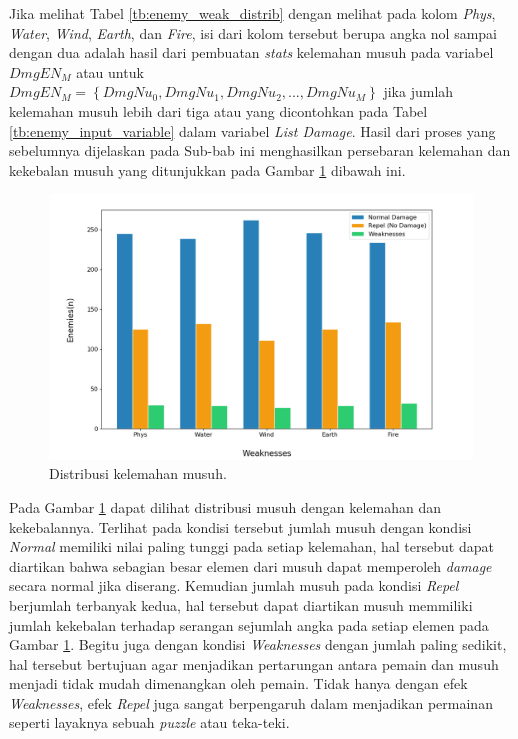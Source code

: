 Jika melihat Tabel \ref{tb:enemy_weak_distrib} dengan melihat pada kolom \textit{Phys}, \textit{Water}, \textit{Wind}, \textit{Earth}, dan \textit{Fire}, isi dari kolom tersebut berupa angka nol sampai dengan dua adalah hasil dari pembuatan \textit{stats} kelemahan musuh pada variabel $DmgEN_{M}$ atau untuk $DmgEN_{M} = \left \{ DmgNu_{0}, DmgNu_{1}, DmgNu_{2},..., DmgNu_{M} \right \}$ jika jumlah kelemahan musuh lebih dari tiga atau yang dicontohkan pada Tabel \ref{tb:enemy_input_variable} dalam variabel \textit{List Damage}. Hasil dari proses yang sebelumnya dijelaskan pada Sub-bab ini menghasilkan persebaran kelemahan dan kekebalan musuh yang ditunjukkan pada Gambar \ref{fig:enemy_weak_distrib} dibawah ini.

\begin{figure} [!h] \centering
	\includegraphics[scale=0.50]{img/EnemyWeakDistrib.png}
	\caption{Distribusi kelemahan musuh.}
	\label{fig:enemy_weak_distrib}
\end{figure}

Pada Gambar \ref{fig:enemy_weak_distrib} dapat dilihat distribusi musuh dengan kelemahan dan kekebalannya. Terlihat pada kondisi tersebut jumlah musuh dengan kondisi \textit{Normal} memiliki nilai paling tunggi pada setiap kelemahan, hal tersebut dapat diartikan bahwa sebagian besar elemen dari musuh dapat memperoleh \textit{damage} secara normal jika diserang. Kemudian jumlah musuh pada kondisi \textit{Repel} berjumlah terbanyak kedua, hal tersebut dapat diartikan musuh memmiliki jumlah kekebalan terhadap serangan sejumlah angka pada setiap elemen pada Gambar \ref{fig:enemy_weak_distrib}. Begitu juga dengan kondisi \textit{Weaknesses} dengan jumlah paling sedikit, hal tersebut bertujuan agar menjadikan pertarungan antara pemain dan musuh menjadi tidak mudah dimenangkan oleh pemain. Tidak hanya dengan efek \textit{Weaknesses}, efek \textit{Repel} juga sangat berpengaruh dalam menjadikan permainan seperti layaknya sebuah \textit{puzzle} atau teka-teki.
\vspace{1ex}

